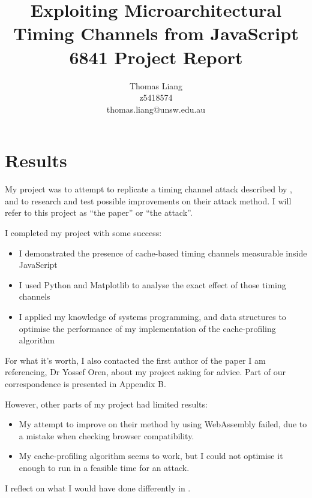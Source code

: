 \documentclass[a4paper,10pt,twocolumn]{article}
\title{
  Exploiting Microarchitectural Timing Channels from JavaScript \\
  \acronym{Comp}6841 Project Report}
\author{Thomas Liang \\ z5418574 \\ \textsf{thomas.liang@unsw.edu.au}} %
\theoremstyle{definition}
\begin{document}
\maketitle

\section{Results}

My project was to attempt to replicate a timing channel attack described by
\textcite{Oren_KSK_2015}, and to research and test possible improvements on
their attack method.
I will refer to this project as ``the paper'' or ``the attack''.


I completed my project with some success:
\begin{itemize}[nosep]
\item I demonstrated the presence of cache-based timing channels measurable
  inside JavaScript
\item I used Python and Matplotlib to analyse the exact effect of those timing
  channels
\item I applied my knowledge of systems programming, and data structures to
  optimise the performance of my implementation of the cache-profiling algorithm
\end{itemize}
For what it's worth, I also contacted the first author of the paper I am
referencing, Dr Yossef Oren, about my project asking for advice.
Part of our correspondence is presented in Appendix B.

However, other parts of my project had limited results:
\begin{itemize}[nosep]
\item My attempt to improve on their method by using WebAssembly failed, due to
  a mistake when checking browser compatibility.
\item My cache-profiling algorithm seems to work, but I could not optimise it
  enough to run in a feasible time for an attack.
\end{itemize}
I reflect on what I would have done differently in .
\end{document}
